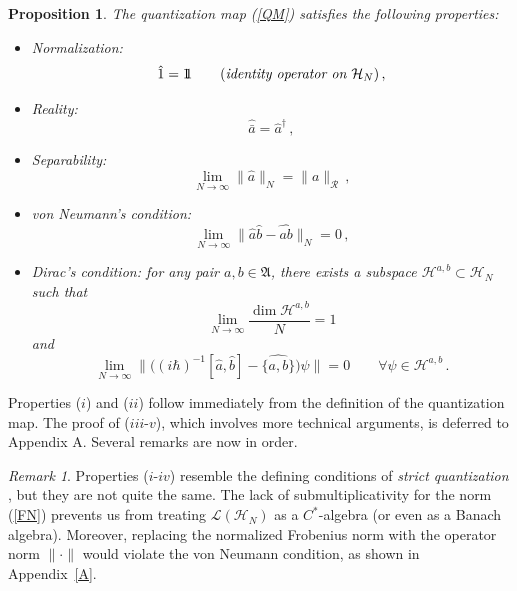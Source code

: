 \documentclass[12pt,a4paper]{article}
\numberwithin{equation}{section}
\theoremstyle{theorem}
\newtheorem{proposition}[]{Proposition}
\theoremstyle{remark}
\newtheorem{remark}[equation]{Remark}
\newcommand{\R}{\mathcal{R}}
\newcommand{\hh}{\mathcal{H}}
\newcommand{\hn}{\mathcal{H}_N}
\newcommand{\fa}{\mathfrak{A}}
\newcommand{\I}{1\!\! 1}
\begin{document}
\begin{proposition}\label{P1} 
The quantization map (\ref{QM}) satisfies the following properties:
\begin{itemize}
\item[i)] Normalization:
$$
\hat 1=\I\qquad (\mbox{\it identity operator on } \hn)\,,
$$
\item[ii)] Reality:
$$
\widehat{\bar a}=\hat{a}^\dagger\,,
$$
    \item[iii)] {Separability:} $$ \lim_{N\rightarrow \infty}\|\hat a\|_N=\|a\|_\R\,,$$ 
\item [iv)]{ von Neumann's condition:} 
$$
\lim_{N\to\infty}\|\hat a\hat b-\widehat{ab}\|_N=0\,,
$$
\item[v)] Dirac's condition: for any pair $a,b\in \fa$, there exists a subspace $\hh^{a,b}\subset \hh_N$ such that
$$
\lim_{N\rightarrow \infty}\frac{\dim\hh^{a,b}}{N}=1
$$
and
$$
\lim_{N\to\infty}\big\|\big((i\hbar)^{-1}[\hat a, \hat b]-\widehat{\{a, b\}}\big)\psi\big\|=0\qquad \forall \psi\in \hh^{a,b}\,.
$$
\end{itemize}
\end{proposition} 
Properties ($i$) and ($ii$) follow immediately from the definition of the quantization map.
The proof of ($iii$-$v$), which involves more technical arguments, is deferred to Appendix A. Several remarks are now in order. 
\begin{remark}
    Properties ($i$-$iv$) resemble the defining conditions of {\it strict quantization} \cite{rieffel1994quantization, hawkins2008obstruction, landsman2012mathematical}, but they are not quite the same. The lack of submultiplicativity for the norm (\ref{FN}) prevents us from treating $\mathscr{L}(\hn)$ as a $C^\ast$-algebra (or even as a Banach algebra).  Moreover, replacing the normalized Frobenius norm with the operator norm $\|\cdot \|$ would violate the von Neumann condition, as shown in Appendix~\ref{A}.
    \end{remark}
\end{document}
